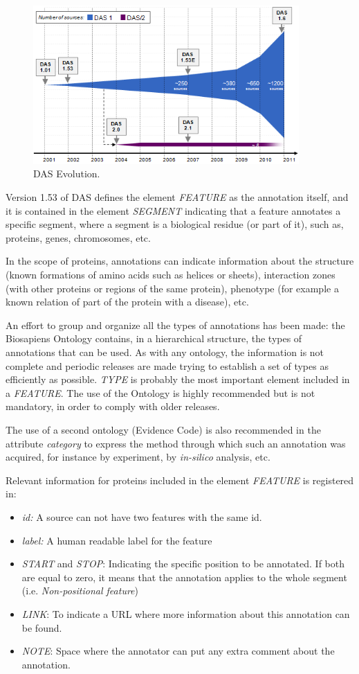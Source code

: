 \begin{figure}  
\centering
\includegraphics[width=4in]{figures/DasEvolution2.PNG}
\caption[DAS Evolution.]{DAS Evolution.
\label{fig:dasevolution}}
\end{figure}

Version 1.53 of DAS defines the element \emph{FEATURE} as the annotation itself, and it is contained in the element \emph{SEGMENT} indicating that a feature annotates a specific segment, where a segment is a biological residue (or part of it), such as, proteins, genes, chromosomes, etc.

In the scope of proteins, annotations can indicate information about the structure (known formations of amino acids such as helices or sheets), interaction zones (with other proteins or regions of the same protein), phenotype (for example a known relation of part of the protein with a disease), etc. 

An effort to group and organize all the types of annotations has been made: the Biosapiens Ontology contains, in a hierarchical structure, the types of annotations that can be used. As with any ontology, the information is not complete and periodic releases are made trying to establish a set of types as efficiently as possible.  \emph{TYPE} is probably the most important element included in a \emph{FEATURE}. The use of the Ontology is highly recommended but is not mandatory, in order to comply with older releases. 

The use of a second ontology (Evidence Code) is also recommended in the attribute \emph{category} to express the method through which such an annotation was acquired, for instance by experiment, by \emph{in-silico} analysis, etc.

Relevant information for proteins included in the element \emph{FEATURE} is registered in:

\begin{itemize}
 \item \emph{id:} A source can not have two features with the same id.
 \item \emph{label:} A human readable label for the feature
 \item \emph{START} and \emph{STOP}: Indicating the specific position to be annotated. If both are equal to zero, it means that the annotation applies to the whole segment (i.e. \emph{Non-positional feature})
 \item \emph{LINK}: To indicate a URL where more information about this annotation can be found.
 \item \emph{NOTE}: Space where the annotator can put any extra comment about the annotation.
\end{itemize}

